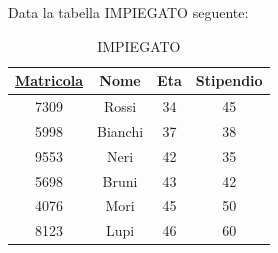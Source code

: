 \documentclass{article}
\begin{document}
Data la tabella IMPIEGATO seguente:
\begin{table}[h!]
    \centering
    \begin{tabular}{|c|c|c|c|}
        \hline
        \textbf{\underline{Matricola}} & \textbf{Nome} & \textbf{Eta} & \textbf{Stipendio} \\
        \hline
        7309 & Rossi & 34 & 45 \\
        \hline
        5998 & Bianchi & 37 & 38 \\
        \hline
        9553 & Neri & 42 & 35 \\
        \hline
        5698 & Bruni & 43 & 42 \\
        \hline
             4076 & Mori & 45 & 50\\
        \hline
             8123 & Lupi & 46 & 60 \\
        \hline
    \end{tabular}
    \caption{IMPIEGATO}
\end{table}
\end{document}
